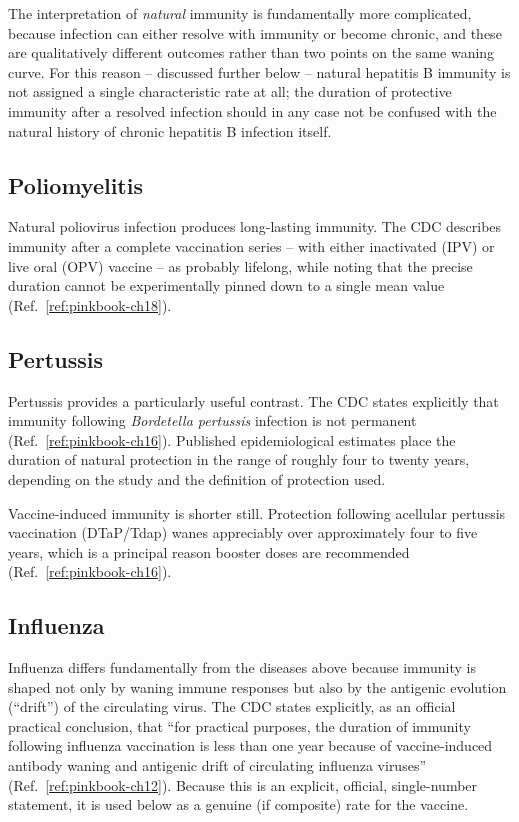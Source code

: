 \documentclass[11pt]{article}
\begin{document}
The interpretation of \emph{natural} immunity is fundamentally more
complicated, because infection can either resolve with immunity or become
chronic, and these are qualitatively different outcomes rather than two
points on the same waning curve. For this reason -- discussed further below
-- natural hepatitis B immunity is not assigned a single characteristic
rate at all; the duration of protective immunity after a resolved infection
should in any case not be confused with the natural history of chronic
hepatitis B infection itself.

\subsection{Poliomyelitis}

Natural poliovirus infection produces long-lasting immunity. The CDC
describes immunity after a complete vaccination series -- with either
inactivated (IPV) or live oral (OPV) vaccine -- as probably lifelong,
while noting that the precise duration cannot be experimentally pinned down
to a single mean value (Ref.~\ref{ref:pinkbook-ch18}).

\subsection{Pertussis}

Pertussis provides a particularly useful contrast. The CDC states
explicitly that immunity following \emph{Bordetella pertussis} infection is
not permanent (Ref.~\ref{ref:pinkbook-ch16}). Published epidemiological
estimates place the duration of natural protection in the range of roughly
four to twenty years, depending on the study and the definition of
protection used.

Vaccine-induced immunity is shorter still. Protection following
acellular pertussis vaccination (DTaP/Tdap) wanes appreciably over
approximately four to five years, which is a principal reason booster doses
are recommended (Ref.~\ref{ref:pinkbook-ch16}).

\subsection{Influenza}

Influenza differs fundamentally from the diseases above because immunity is
shaped not only by waning immune responses but also by the antigenic
evolution (``drift'') of the circulating virus. The CDC states explicitly,
as an official practical conclusion, that ``for practical purposes, the
duration of immunity following influenza vaccination is less than one year
because of vaccine-induced antibody waning and antigenic drift of
circulating influenza viruses'' (Ref.~\ref{ref:pinkbook-ch12}). Because this
is an explicit, official, single-number statement, it is used below as a
genuine (if composite) rate for the vaccine.
\end{document}
